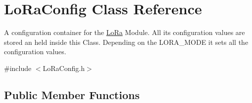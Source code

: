 \hypertarget{class_lo_ra_config}{}\section{Lo\+Ra\+Config Class Reference}
\label{class_lo_ra_config}


A configuration container for the \hyperlink{class_lo_ra}{Lo\+Ra} Module. All its configuration values are stored an held inside this Class. Depending on the L\+O\+R\+A\+\_\+\+M\+O\+D\+E it sets all the configuration values.  




{\ttfamily \#include $<$Lo\+Ra\+Config.\+h$>$}

\subsection*{Public Member Functions}
